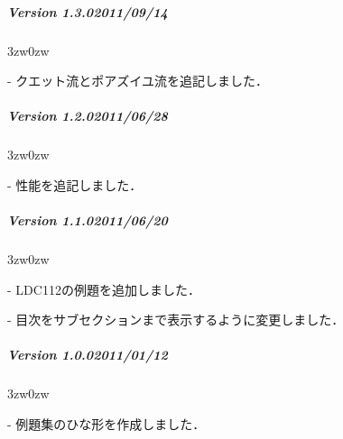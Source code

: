 
{
\small

%
\subparagraph{Version 1.3.0\hspace{1cm}2011/09/14}

\begin{description}
\begin{indentation}{3zw}{0zw}
\item[-] クエット流とポアズイユ流を追記しました．
\end{indentation}
\end{description}
\vspace{2mm}

%
\subparagraph{Version 1.2.0\hspace{1cm}2011/06/28}

\begin{description}
\begin{indentation}{3zw}{0zw}
\item[-] 性能を追記しました．
\end{indentation}
\end{description}
\vspace{2mm}

%
\subparagraph{Version 1.1.0\hspace{1cm}2011/06/20}

\begin{description}
\begin{indentation}{3zw}{0zw}
\item[-] LDC112の例題を追加しました．
\item[-] 目次をサブセクションまで表示するように変更しました．
\end{indentation}
\end{description}
\vspace{2mm}

%
\subparagraph{Version 1.0.0\hspace{1cm}2011/01/12}

\begin{description}
\begin{indentation}{3zw}{0zw}
\item[-] 例題集のひな形を作成しました．
\end{indentation}
\end{description}

}
